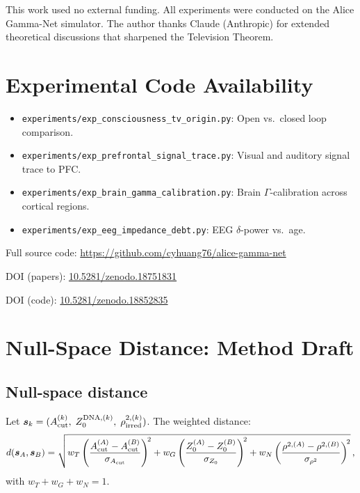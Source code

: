 \documentclass[aps,pre,twocolumn,superscriptaddress,floatfix]{revtex4-2}
\begin{document}
\begin{acknowledgments}
This work used no external funding.
All experiments were conducted on the Alice Gamma-Net simulator.
The author thanks Claude (Anthropic) for extended
theoretical discussions that sharpened the Television Theorem.
\end{acknowledgments}


\appendix

\section{Experimental Code Availability}
\label{app:code}

\begin{itemize}
  \item \texttt{experiments/exp\_consciousness\_tv\_origin.py}:
    Open vs.\ closed loop comparison.
  \item \texttt{experiments/exp\_prefrontal\_signal\_trace.py}:
    Visual and auditory signal trace to PFC.
  \item \texttt{experiments/exp\_brain\_gamma\_calibration.py}:
    Brain $\Gamma$-calibration across cortical regions.
  \item \texttt{experiments/exp\_eeg\_impedance\_debt.py}:
    EEG $\delta$-power vs.\ age.
\end{itemize}
Full source code: \url{https://github.com/cyhuang76/alice-gamma-net}

DOI (papers): \href{https://doi.org/10.5281/zenodo.18751831}{10.5281/zenodo.18751831}

DOI (code): \href{https://doi.org/10.5281/zenodo.18852835}{10.5281/zenodo.18852835}


\section{Null-Space Distance: Method Draft}
\label{app:null-space-method}

\subsection{Null-space distance}

Let $\bm{s}_k = (A_{\text{cut}}^{(k)},\; Z_0^{\text{DNA},(k)},\;
  \rho_{\text{irred}}^{2,(k)})$.
The weighted distance:
\begin{equation}
  d(\bm{s}_A,\bm{s}_B)
  = \sqrt{
      w_T \left(\frac{A_{\text{cut}}^{(A)}-A_{\text{cut}}^{(B)}}
                     {\sigma_{A_{\text{cut}}}}\right)^{\!2}
    + w_G \left(\frac{Z_0^{(A)}-Z_0^{(B)}}
                     {\sigma_{Z_0}}\right)^{\!2}
    + w_N \left(\frac{\rho^{2,(A)}-\rho^{2,(B)}}
                     {\sigma_{\rho^2}}\right)^{\!2}
  }\,,
  \label{eq:null-space-distance}
\end{equation}
with $w_T + w_G + w_N = 1$.
\end{document}
